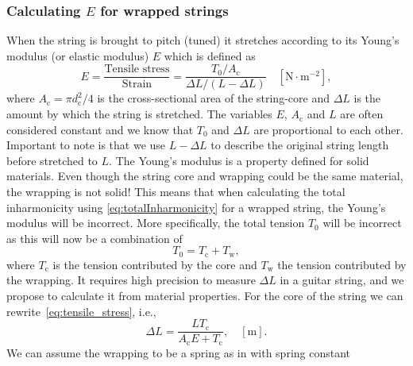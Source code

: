 \documentclass{article}
\begin{document}
\begin{sloppy}
\subsubsection{Calculating $E$ for wrapped strings}%
%
When the string is brought to pitch (tuned) it stretches according to its Young's modulus (or elastic modulus) $E$ which is defined as
%
\begin{equation}\label{eq:tensile_stress}
    E = \frac{\text{Tensile stress}}{\text{Strain}}
    = \frac{T_0/A_\text{c}}{\Delta L/(L - \Delta L)} \quad [\text{N}\cdot\text{m}^{-2}], 
\end{equation}
%
where $A_\text{c} = \pi d_\text{c}^2/4$ is the cross-sectional area of the string-core and $\Delta L$ is the amount by which the string is stretched. The variables $E$, $A_\text{c}$ and $L$ are often considered constant and we know that $T_0$ and $\Delta L$ are proportional to each other. Important to note is that we use $L - \Delta L$ to describe the original string length before stretched to $L$. The Young's modulus is a property defined for solid materials. Even though the string core and wrapping could be the same material, the wrapping is not solid! This means that when calculating the total inharmonicity using \eqref{eq:totalInharmonicity} for a wrapped string, the Young's modulus will be incorrect. %
More specifically, the total tension $T_0$ will be incorrect as this will now be a combination of
\begin{equation}\label{eq:totalTension}
    T_0 = T_\text{c} + T_\text{w},
\end{equation}
where $T_\text{c}$ is the tension contributed by the core and $T_\text{w}$ the tension contributed by the wrapping. %
%
It requires high precision to measure $\Delta L$ in a guitar string, and we propose to calculate it from material properties. For the core of the string we can rewrite~\eqref{eq:tensile_stress}, i.e.,
%
\begin{equation}\label{eq:deltaL}
    \Delta L= \frac{LT_\text{c}}{A_\text{c}E + T_\text{c}}, \quad  [\text{m}]. 
\end{equation}
%
We can assume the wrapping to be a spring as in \cite{kemp:wound_and_unwound_strings} with spring constant ~\cite{childs:mechanical_engineering}

\end{sloppy}
\end{document}
